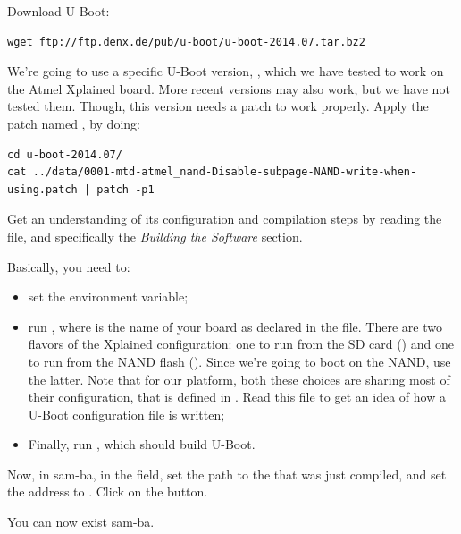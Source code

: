 Download U-Boot:

\begin{verbatim}
wget ftp://ftp.denx.de/pub/u-boot/u-boot-2014.07.tar.bz2
\end{verbatim}

We're going to use a specific U-Boot version, , which we
have tested to work on the Atmel Xplained board. More recent versions
may also work, but we have not tested them.  Though, this version
needs a patch to work properly. Apply the patch named
,
by doing:

{\small
\begin{verbatim}
cd u-boot-2014.07/
cat ../data/0001-mtd-atmel_nand-Disable-subpage-NAND-write-when-using.patch | patch -p1
\end{verbatim}
}

Get an understanding of its configuration and compilation steps by
reading the  file, and specifically the {\em Building the
  Software} section.

Basically, you need to:

\begin{itemize}

\item set the  environment variable;

\item run , where  is the name
  of your board as declared in the  file. There are
  two flavors of the Xplained configuration: one to run from the SD card
  () and one to run from the NAND flash
  (). Since we're going to boot on
  the NAND, use the latter. Note that for our platform, both these
  choices are sharing most of their configuration, that is defined in
  . Read this file to get an
  idea of how a U-Boot configuration file is written;

\item Finally, run , which should build U-Boot.

\end{itemize}

Now, in sam-ba, in the  field, set the path to
the  that was just compiled, and set the address to
. Click on the  button.

You can now exist sam-ba.

